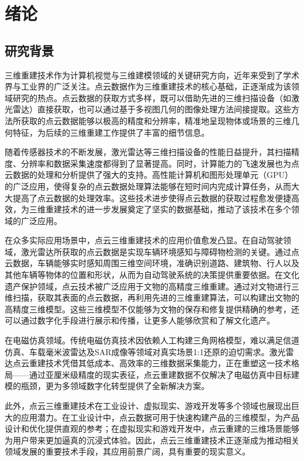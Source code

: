 \documentclass{xduugthesis}
\begin{document}
\chapter{绪论}
\section{研究背景}
三维重建技术作为计算机视觉与三维建模领域的关键研究方向，近年来受到了学术界与工业界的广泛关注。点云数据作为三维重建技术的核心基础，正逐渐成为该领域研究的热点。点云数据的获取方式多样，既可以借助先进的三维扫描设备（如激光雷达）直接获取，也可以通过基于多视图几何的图像处理方法间接提取。这些方法所获取的点云数据能够以极高的精度和分辨率，精准地呈现物体或场景的三维几何特征，为后续的三维重建工作提供了丰富的细节信息。

随着传感器技术的不断发展，激光雷达等三维扫描设备的性能日益提升，其扫描精度、分辨率和数据采集速度都得到了显著提高。同时，计算能力的飞速发展也为点云数据的处理和分析提供了强大的支持。高性能计算机和图形处理单元（GPU）的广泛应用，使得复杂的点云数据处理算法能够在短时间内完成计算任务，从而大大提高了点云数据的处理效率。这些技术进步使得点云数据的获取过程愈发便捷高效，为三维重建技术的进一步发展奠定了坚实的数据基础，推动了该技术在多个领域的广泛应用。

在众多实际应用场景中，点云三维重建技术的应用价值愈发凸显。在自动驾驶领域，激光雷达所获取的点云数据是实现车辆环境感知与障碍物检测的关键。通过点云数据，车辆能够实时感知周围三维空间环境，准确识别道路、建筑物、行人以及其他车辆等物体的位置和形状，从而为自动驾驶系统的决策提供重要依据。在文化遗产保护领域，点云技术被广泛应用于文物的高精度三维重建。通过对文物进行三维扫描，获取其表面的点云数据，再利用先进的三维重建算法，可以构建出文物的高精度三维模型。这些三维模型不仅能够为文物的保存和修复提供精确的参考，还可以通过数字化手段进行展示和传播，让更多人能够欣赏和了解文化遗产。

在电磁仿真领域。传统电磁仿真技术因依赖人工构建三角网格模型，难以满足信道仿真、车载毫米波雷达及SAR成像等领域对真实场景1:1还原的迫切需求。激光雷达点云重建技术凭借其低成本、高效率的三维数据采集能力，正在重塑这一技术格局——通过亚厘米级精度的现实表征，点云重建数据不仅解决了电磁仿真中目标建模的瓶颈，更为多领域数字化转型提供了全新解决方案。

此外，点云三维重建技术在工业设计、虚拟现实、游戏开发等多个领域也展现出巨大的应用潜力。在工业设计中，点云数据可用于快速构建产品的三维模型，为产品设计和优化提供直观的参考；在虚拟现实和游戏开发中，点云重建的三维场景能够为用户带来更加逼真的沉浸式体验。因此，点云三维重建技术正逐渐成为推动相关领域发展的重要技术手段，其应用前景广阔，具有重要的现实意义。
\end{document}
